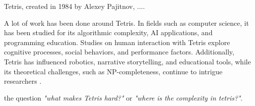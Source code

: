 Tetris, created in 1984 by Alexey Pajitnov, .... 


A lot of work has been done around Tetris. In fields such as computer science, it has been studied for its algorithmic complexity, AI applications, and programming education. Studies on human interaction with Tetris explore cognitive processes, social behaviors, and performance factors. Additionally, Tetris has influenced robotics, narrative storytelling, and educational tools, while its theoretical challenges, such as NP-completeness, continue to intrigue researchers \cite{TWRP}.


the question \emph{"what makes Tetris hard?"} or \emph{"where is the complexity in tetris?"}.
